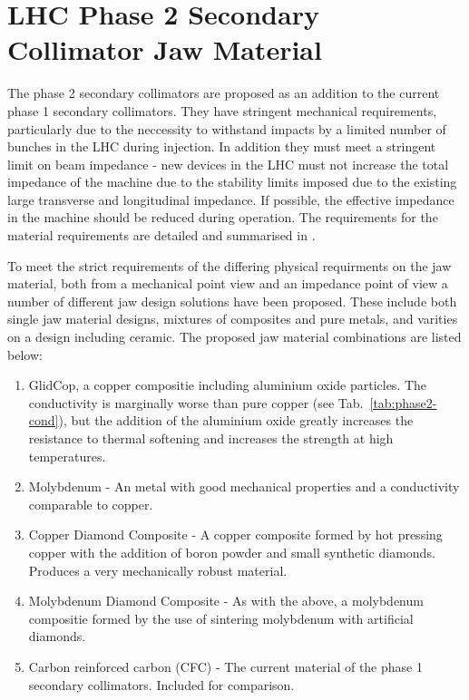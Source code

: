 \section{LHC Phase 2 Secondary Collimator Jaw Material}
\label{sec:phase-2-col-mat}

The phase 2 secondary collimators are proposed as an addition to the current phase 1 secondary collimators. They have stringent mechanical requirements, particularly due to the neccessity to withstand impacts by a limited number of bunches in the LHC during injection. In addition they must meet a stringent limit on beam impedance - new devices in the LHC must not increase the total impedance of the machine due to the stability limits imposed due to the existing large transverse and longitudinal impedance. If possible, the effective impedance in the machine should be reduced during operation. The requirements for the material requirements are detailed and summarised in \cite{Bertarelli:Mat}.

To meet the strict requirements of the differing physical requirments on the jaw material, both from a mechanical point view and an impedance point of view a number of different jaw design solutions have been proposed. These include both single jaw material designs, mixtures of composites and pure metals, and varities on a design including ceramic. The proposed jaw material combinations are listed below:

\begin{enumerate}
\item{GlidCop, a copper compositie including aluminium oxide particles. The conductivity is marginally worse than pure copper (see Tab.~\ref{tab:phase2-cond}), but the addition of the aluminium oxide greatly increases the resistance to thermal softening and increases the strength at high temperatures.}
\item{Molybdenum - An metal with good mechanical properties and a conductivity comparable to copper.}
\item{Copper Diamond Composite - A copper composite formed by hot pressing copper with the addition of boron powder and small synthetic diamonds. Produces a very mechanically robust material.}
\item{Molybdenum Diamond Composite - As with the above, a molybdenum compositie formed by the use of sintering molybdenum with artificial diamonds.}
\item{Carbon reinforced carbon (CFC) - The current material of the phase 1 secondary collimators. Included for comparison.}
\end{enumerate}

